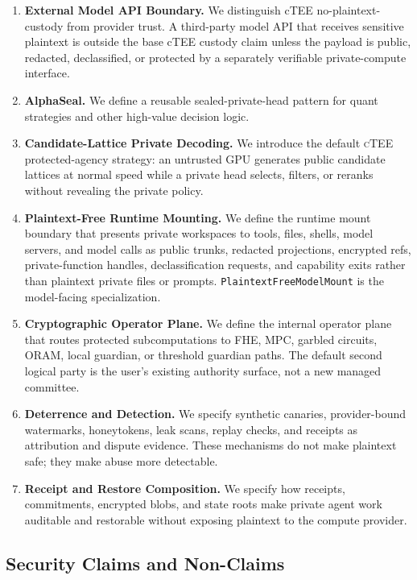 \documentclass[11pt]{article}
\newcommand{\ctee}{\textnormal{\textsc{cTEE}}}
\newcommand{\code}[1]{\texttt{#1}}
\begin{document}
\begin{enumerate}[leftmargin=1.5em]
declassification leakage at the cost of extra public token volume.
\item \textbf{External Model API Boundary.} We distinguish cTEE
no-plaintext-custody from provider trust. A third-party model API that receives
sensitive plaintext is outside the base cTEE custody claim unless the payload is
public, redacted, declassified, or protected by a separately verifiable
private-compute interface.
\item \textbf{AlphaSeal.} We define a reusable sealed-private-head pattern for
quant strategies and other high-value decision logic.
\item \textbf{Candidate-Lattice Private Decoding.} We introduce the default
\ctee{} protected-agency strategy: an untrusted GPU generates public candidate
lattices at normal speed while a private head selects, filters, or reranks
without revealing the private policy.
\item \textbf{Plaintext-Free Runtime Mounting.} We define the runtime mount
boundary that presents private workspaces to tools, files, shells, model
servers, and model calls as public trunks, redacted projections, encrypted
refs, private-function handles, declassification requests, and capability exits
rather than plaintext private files or prompts. \code{PlaintextFreeModelMount}
is the model-facing specialization.
\item \textbf{Cryptographic Operator Plane.} We define the internal operator
plane that routes protected subcomputations to FHE, MPC, garbled circuits,
ORAM, local guardian, or threshold guardian paths. The default second logical
party is the user's existing authority surface, not a new managed committee.
\item \textbf{Deterrence and Detection.} We specify synthetic canaries,
provider-bound watermarks, honeytokens, leak scans, replay checks, and receipts
as attribution and dispute evidence. These mechanisms do not make plaintext
safe; they make abuse more detectable.
\item \textbf{Receipt and Restore Composition.} We specify how receipts,
commitments, encrypted blobs, and state roots make private agent work
auditable and restorable without exposing plaintext to the compute provider.
\end{enumerate}

\subsection{Security Claims and Non-Claims}
\end{document}
